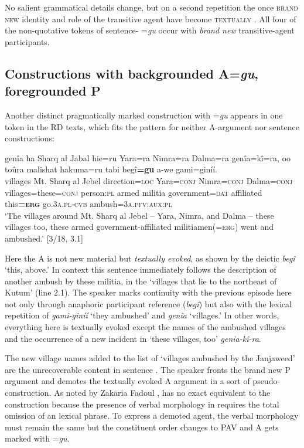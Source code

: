 \documentclass[output=paper,modfonts]{langscibook}
\begin{document}
No salient grammatical details change, but on a second repetition the once \textsc{brand new} identity and role of the transitive agent have become \textsc{textually } \citep[233--237]{Prince1981}. All four of the non-quotative tokens of sentence- =\textit{gu} occur with \textit{brand new} transitive-agent participants.

\subsection{Constructions with backgrounded A=\textit{gu}, foregrounded P}\label{sec:wolfe:3.3}

Another distinct pragmatically marked construction with =\textit{gu} appears in one token in the RD texts, which fits the pattern for neither A-argument  nor sentence  constructions:

\ea\label{ex:wolfe:11}
\gll genîa ha Sharq al Jabal hie=ru Yara=ra Nimra=ra Dalma=ra genîa=kî=ra, oo toûra malishat hakuma=ru tabi begî\textbf{=gu} a-we gami=giníí.\\
     villages Mt. Sharq al Jebel direction=\textsc{loc} Yara=\textsc{conj} Nimra=\textsc{conj} Dalma=\textsc{conj} villages=these=\textsc{conj} person:\textsc{pl} armed militia government=\textsc{dat} affiliated this\textbf{=}\textsc{\textbf{erg}} go.\textsc{3}\textsc{a}.\textsc{pl}-\textsc{cvb} ambush=\textsc{3}\textsc{a}.\textsc{pfv}:\textsc{aux}:\textsc{pl}\\
\glt ‘The villages around Mt. Sharq al Jebel – Yara, Nimra, and Dalma – these villages too, these armed government-affiliated militiamen(=\textsc{erg}) went and ambushed.’ [3/18, 3.1]
\z

Here the A is not new material but \textit{textually evoked}, as shown by the deictic \textit{begî} ‘this, above.’ In context this sentence immediately follows the description of another ambush by these militia, in the ‘villages that lie to the northeast of Kutum’ (line 2.1). The speaker marks continuity with the previous episode here not only through anaphoric participant reference (\textit{begî}) but also with the lexical repetition of \textit{gami-giníí} ‘they ambushed’ and \textit{genîa} ‘villages.’ In other words, everything here is textually evoked except the names of the ambushed villages and the occurrence of a new incident in ‘these villages, too’ \textit{genia-kî-ra}. 

The new village names added to the list of ‘villages ambushed by the Janjaweed’ are the unrecoverable content in sentence . The speaker fronts the brand new P argument and demotes the textually evoked A argument in a sort of pseudo- construction. As noted by Zakaria Fadoul \citet[80]{Khidir2005},  has no exact equivalent to the   construction because the presence of  verbal morphology in  requires the total omission of an  lexical  phrase. To express a demoted agent, the verbal morphology must remain the same but the constituent order changes to PAV and A gets marked with =\textit{gu}.
\end{document}
